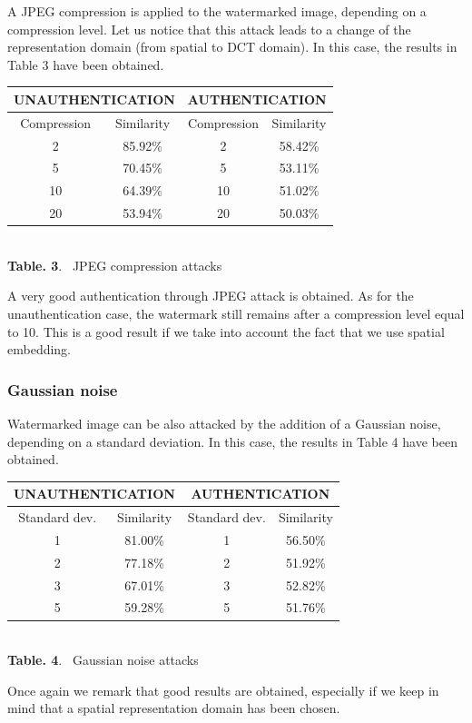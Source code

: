 A JPEG compression is applied to the watermarked image, depending on a
compression level. Let us notice that this attack leads to a change of
the representation domain (from spatial to DCT domain). In this case, the results in Table 3 have been obtained.

\begin{center}
\begin{footnotesize}
\begin{tabular}{|c|c||c|c|}
\hline
\multicolumn{2}{|c||}{UNAUTHENTICATION}  & \multicolumn{2}{c|}{AUTHENTICATION}\\ 
\hline
Compression & Similarity & Compression & Similarity \\
 \hline
2 & 85.92\% & 2 & 58.42\% \\
5 & 70.45\% & 5 & 53.11\% \\
10 & 64.39\% & 10 & 51.02\% \\
20 & 53.94\% & 20 & 50.03\% \\
\hline
\end{tabular}
\end{footnotesize}\\
\vspace{0.5cm}
\textbf{Table. 3}. ~JPEG compression attacks
\end{center}

A very good authentication through JPEG attack is obtained. As for the
unauthentication case, the watermark still remains after a compression level
equal to 10. This is a good result if we take into account the fact that we
use spatial embedding.

\subsubsection{Gaussian noise}

Watermarked image can be also attacked by the addition of a Gaussian noise, depending on a standard deviation. In this case, the results in Table 4 have been obtained.


\begin{center}
\begin{footnotesize}
\begin{tabular}{|c|c||c|c|}
\hline
\multicolumn{2}{|c||}{UNAUTHENTICATION}  & \multicolumn{2}{c|}{AUTHENTICATION}\\ 
\hline
Standard dev. & Similarity & Standard dev. & Similarity \\
 \hline
1 & 81.00\% & 1 & 56.50\% \\
2 & 77.18\% & 2 & 51.92\% \\
3 & 67.01\% & 3 & 52.82\% \\
5 & 59.28\% & 5 & 51.76\% \\
\hline
\end{tabular}
\end{footnotesize}\\
\vspace{0.5cm}
\textbf{Table. 4}. ~Gaussian noise attacks
\end{center}


Once again we remark that good results are obtained, especially if we keep in
mind that a spatial representation domain has been chosen.


